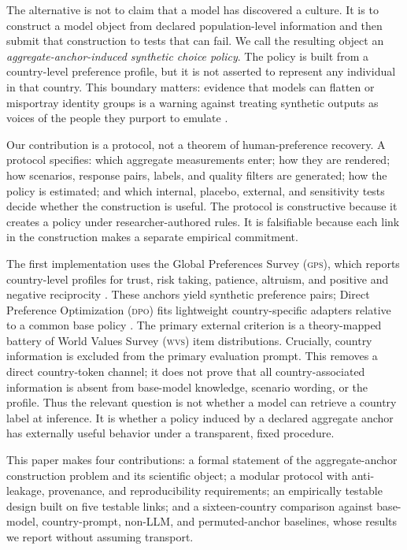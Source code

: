 \documentclass[10pt,letterpaper]{article}
\newcommand{\WVS}{\textsc{wvs}}
\newcommand{\GPS}{\textsc{gps}}
\newcommand{\DPO}{\textsc{dpo}}
\begin{document}
The alternative is not to claim that a model has discovered a culture. It is to construct a model object from declared population-level information and then submit that construction to tests that can fail. We call the resulting object an \emph{aggregate-anchor-induced synthetic choice policy}. The policy is built from a country-level preference profile, but it is not asserted to represent any individual in that country. This boundary matters: evidence that models can flatten or misportray identity groups is a warning against treating synthetic outputs as voices of the people they purport to emulate \cite{wang2025}.

Our contribution is a protocol, not a theorem of human-preference recovery. A protocol specifies: which aggregate measurements enter; how they are rendered; how scenarios, response pairs, labels, and quality filters are generated; how the policy is estimated; and which internal, placebo, external, and sensitivity tests decide whether the construction is useful. The protocol is constructive because it creates a policy under researcher-authored rules. It is falsifiable because each link in the construction makes a separate empirical commitment.

The first implementation uses the Global Preferences Survey (\GPS), which reports country-level profiles for trust, risk taking, patience, altruism, and positive and negative reciprocity \cite{falk2018}. These anchors yield synthetic preference pairs; Direct Preference Optimization (\DPO) fits lightweight country-specific adapters relative to a common base policy \cite{rafailov2023}. The primary external criterion is a theory-mapped battery of World Values Survey (\WVS) item distributions. Crucially, country information is excluded from the primary evaluation prompt. This removes a direct country-token channel; it does not prove that all country-associated information is absent from base-model knowledge, scenario wording, or the profile. Thus the relevant question is not whether a model can retrieve a country label at inference. It is whether a policy induced by a declared aggregate anchor has externally useful behavior under a transparent, fixed procedure.

This paper makes four contributions: a formal statement of the aggregate-anchor construction problem and its scientific object; a modular protocol with anti-leakage, provenance, and reproducibility requirements; an empirically testable design built on five testable links; and a sixteen-country comparison against base-model, country-prompt, non-LLM, and permuted-anchor baselines, whose results we report without assuming transport.
\end{document}
